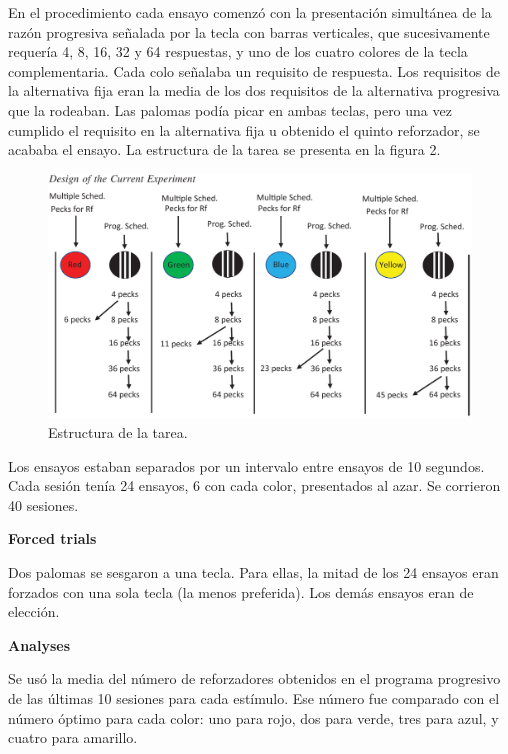 \documentclass[a4paper,12pt]{article}
\begin{document}
En el procedimiento cada ensayo comenzó con la presentación simultánea de la razón progresiva señalada por la tecla con barras verticales, que sucesivamente requería 4, 8, 16, 32 y 64 respuestas, y uno de los cuatro colores de la tecla complementaria. Cada colo señalaba un requisito de respuesta. Los requisitos de la alternativa fija eran la media de los dos requisitos de la alternativa progresiva que la rodeaban. Las palomas podía picar en ambas teclas, pero una vez cumplido el requisito en la alternativa fija u obtenido el quinto reforzador, se acababa el ensayo. La estructura de la tarea se presenta en la figura 2.

\begin{figure}[ht]
	\begin{center}
		\includegraphics[scale=0.5]{Chandel2021(2).png}
		\caption{Estructura de la tarea.}
	\end{center}
\end{figure}

Los ensayos estaban separados por un intervalo entre ensayos de 10 segundos. Cada sesión tenía 24 ensayos, 6 con cada color, presentados al azar. Se corrieron 40 sesiones.

{\bfseries Forced trials}

Dos palomas se sesgaron a una tecla. Para ellas, la mitad de los 24 ensayos eran forzados con una sola tecla (la menos preferida). Los demás ensayos eran de elección.

{\bfseries Analyses}

Se usó la media del número de reforzadores obtenidos en el programa progresivo de las últimas 10 sesiones para cada estímulo. Ese número fue comparado con el número óptimo para cada color: uno para rojo, dos para verde, tres para azul, y cuatro para amarillo.
\end{document}
